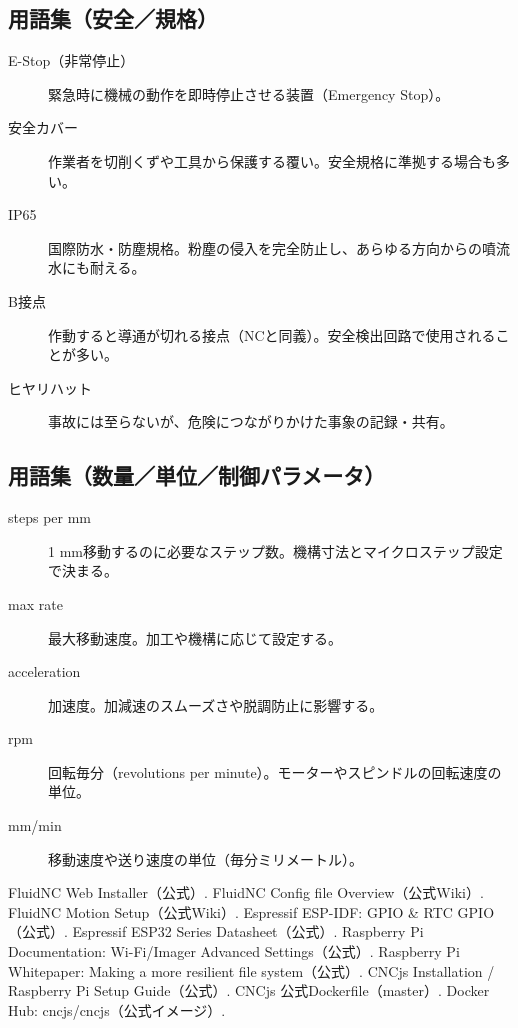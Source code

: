 \documentclass[uplatex,dvipdfmx]{ujarticle}
\begin{document}
\subsection*{用語集（安全／規格）}
\begin{description}
  \item[E-Stop（非常停止）] 緊急時に機械の動作を即時停止させる装置（Emergency Stop）。
  \item[安全カバー] 作業者を切削くずや工具から保護する覆い。安全規格に準拠する場合も多い。
  \item[IP65] 国際防水・防塵規格。粉塵の侵入を完全防止し、あらゆる方向からの噴流水にも耐える。
  \item[B接点] 作動すると導通が切れる接点（NCと同義）。安全検出回路で使用されることが多い。
  \item[ヒヤリハット] 事故には至らないが、危険につながりかけた事象の記録・共有。
\end{description}

\subsection*{用語集（数量／単位／制御パラメータ）}
\begin{description}
  \item[steps per mm] 1 mm移動するのに必要なステップ数。機構寸法とマイクロステップ設定で決まる。
  \item[max rate] 最大移動速度。加工や機構に応じて設定する。
  \item[acceleration] 加速度。加減速のスムーズさや脱調防止に影響する。
  \item[rpm] 回転毎分（revolutions per minute）。モーターやスピンドルの回転速度の単位。
  \item[mm/min] 移動速度や送り速度の単位（毎分ミリメートル）。
\end{description}



\begin{thebibliography}{999}
 FluidNC Web Installer（公式）.
 FluidNC Config file Overview（公式Wiki）.
 FluidNC Motion Setup（公式Wiki）.
 Espressif ESP-IDF: GPIO \& RTC GPIO（公式）.
 Espressif ESP32 Series Datasheet（公式）.
 Raspberry Pi Documentation: Wi-Fi/Imager Advanced Settings（公式）.
 Raspberry Pi Whitepaper: Making a more resilient file system（公式）.
 CNCjs Installation / Raspberry Pi Setup Guide（公式）.
 CNCjs 公式Dockerfile（master）.
 Docker Hub: cncjs/cncjs（公式イメージ）.
\end{thebibliography}
\end{document}
